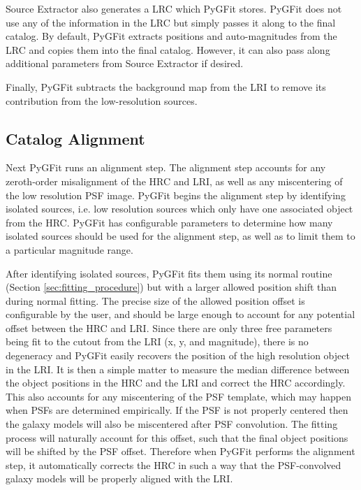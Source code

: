 \documentclass[apj]{emulateapj}
\newcommand{\pygfit}{PyGFit}
\newcommand{\extractor}{Source Extractor}
\begin{document}
\extractor{} also generates a LRC which \pygfit{} stores.  \pygfit{} does not use any of the information in the LRC but simply passes it along to the final catalog.  By default, \pygfit{} extracts positions and auto-magnitudes from the LRC and copies them into the final catalog.  However, it can also pass along additional parameters from \extractor{} if desired.

Finally, \pygfit{} subtracts the background map from the LRI to remove its contribution from the low-resolution sources.

\subsection{Catalog Alignment}\label{sec:alignment}

Next \pygfit{} runs an alignment step.  The alignment step accounts for any zeroth-order misalignment of the HRC and LRI, as well as any miscentering of the low resolution PSF image.  \pygfit{} begins the alignment step by identifying isolated sources, i.e. low resolution sources which only have one associated object from the HRC.  \pygfit{} has configurable parameters to determine how many isolated sources should be used for the alignment step, as well as to limit them to a particular magnitude range.

After identifying isolated sources, \pygfit{} fits them using its normal routine (Section \ref{sec:fitting_procedure}) but with a larger allowed position shift than during normal fitting.  The precise size of the allowed position offset is configurable by the user, and should be large enough to account for any potential offset between the HRC and LRI.  Since there are only three free parameters being fit to the cutout from the LRI (x, y, and magnitude), there is no degeneracy and \pygfit{} easily recovers the position of the high resolution object in the LRI.  It is then a simple matter to measure the median difference between the object positions in the HRC and the LRI and correct the HRC accordingly.  This also accounts for any miscentering of the PSF template, which may happen when PSFs are determined empirically. If the PSF is not properly centered then the galaxy models will also be miscentered after PSF convolution.  The fitting process will naturally account for this offset, such that the final object positions will be shifted by the PSF offset.  Therefore when \pygfit{} performs the alignment step, it automatically corrects the HRC in such a way that the PSF-convolved galaxy models will be properly aligned with the LRI.
\end{document}
